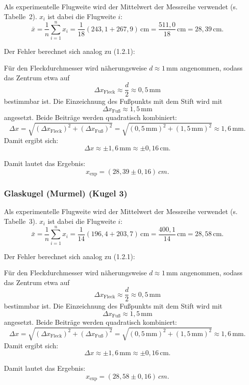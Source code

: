\documentclass{article}
\begin{document}
Als experimentelle Flugweite wird der Mittelwert der Messreihe verwendet (s. Tabelle~2). $x_i$ ist dabei die Flugweite $i$:
\[
\bar{x}=\frac{1}{n}\sum_{i=1}^{n}x_i =\frac{1}{18}\left(243{,}1+267{,}9\right)\,\mathrm{cm}
=\frac{511{,}0}{18}\,\mathrm{cm}
=28{,}39\,\mathrm{cm}.
\]

\noindent
Der Fehler berechnet sich analog zu (1.2.1):

\noindent Für den Fleckdurchmesser wird näherungsweise \(d \approx 1\,\mathrm{mm}\) angenommen, sodass das Zentrum etwa auf
\[
\Delta x_{\text{Fleck}} \approx \frac{d}{2} \approx 0{,}5\,\mathrm{mm}
\]
bestimmbar ist.
Die Einzeichnung des Fußpunkts mit dem Stift wird mit
\[
\Delta x_{\text{Fuß}} \approx 1{,}5\,\mathrm{mm}
\]
angesetzt.
Beide Beiträge werden quadratisch kombiniert:
\[
\Delta x
=
\sqrt{(\Delta x_{\text{Fleck}})^2+(\Delta x_{\text{Fuß}})^2}
=
\sqrt{(0{,}5\,\mathrm{mm})^2+(1{,}5\,\mathrm{mm})^2}
\approx 1{,}6\,\mathrm{mm}.
\]
Damit ergibt sich:
\[
\Delta x \approx \pm 1{,}6\,\mathrm{mm} \approx \pm 0{,}16\,\mathrm{cm}.
\]

\noindent Damit lautet das Ergebnis:
\[
x_{\mathrm{exp}} = (28{,}39 \pm 0{,}16)\,\si{cm}.
\]

\subsubsection{Glaskugel (Murmel) (Kugel 3)}

Als experimentelle Flugweite wird der Mittelwert der Messreihe verwendet (s. Tabelle~3). $x_i$ ist dabei die Flugweite $i$:
\[
\bar{x}=\frac{1}{n}\sum_{i=1}^{n}x_i
=\frac{1}{14}\left(196{,}4+203{,}7\right)\,\mathrm{cm}
=\frac{400{,}1}{14}\,\mathrm{cm}
=28{,}58\,\mathrm{cm}.
\]

\noindent
Der Fehler berechnet sich analog zu (1.2.1):

\noindent Für den Fleckdurchmesser wird näherungsweise \(d \approx 1\,\mathrm{mm}\) angenommen, sodass das Zentrum etwa auf
\[
\Delta x_{\text{Fleck}} \approx \frac{d}{2} \approx 0{,}5\,\mathrm{mm}
\]
bestimmbar ist.
Die Einzeichnung des Fußpunkts mit dem Stift wird mit
\[
\Delta x_{\text{Fuß}} \approx 1{,}5\,\mathrm{mm}
\]
angesetzt.
Beide Beiträge werden quadratisch kombiniert:
\[
\Delta x
=
\sqrt{(\Delta x_{\text{Fleck}})^2+(\Delta x_{\text{Fuß}})^2}
=
\sqrt{(0{,}5\,\mathrm{mm})^2+(1{,}5\,\mathrm{mm})^2}
\approx 1{,}6\,\mathrm{mm}.
\]
Damit ergibt sich:
\[
\Delta x \approx \pm 1{,}6\,\mathrm{mm} \approx \pm 0{,}16\,\mathrm{cm}.
\]

\noindent Damit lautet das Ergebnis:
\[
x_{\mathrm{exp}} = (28{,}58 \pm 0{,}16)\,\si{cm}.
\]
\end{document}

